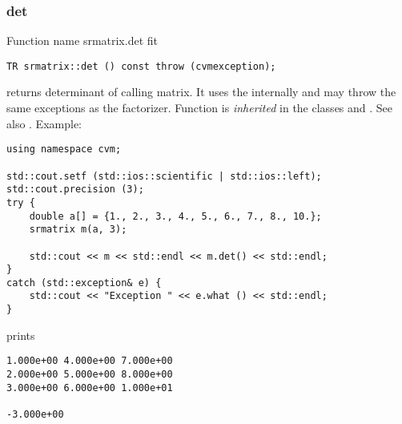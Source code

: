 \subsubsection{det}
Function%
\pdfdest name {srmatrix.det} fit
\begin{verbatim}
TR srmatrix::det () const throw (cvmexception);
\end{verbatim}
returns  determinant of  calling matrix.
It uses the  internally
and may throw the same exceptions as the factorizer.
Function is \emph{inherited} in the classes
and .
See also
.
Example:
\begin{Verbatim}
using namespace cvm;

std::cout.setf (std::ios::scientific | std::ios::left); 
std::cout.precision (3);
try {
    double a[] = {1., 2., 3., 4., 5., 6., 7., 8., 10.};
    srmatrix m(a, 3);

    std::cout << m << std::endl << m.det() << std::endl;
}
catch (std::exception& e) {
    std::cout << "Exception " << e.what () << std::endl;
}
\end{Verbatim}
prints
\begin{Verbatim}
1.000e+00 4.000e+00 7.000e+00
2.000e+00 5.000e+00 8.000e+00
3.000e+00 6.000e+00 1.000e+01

-3.000e+00
\end{Verbatim}
\newpage



